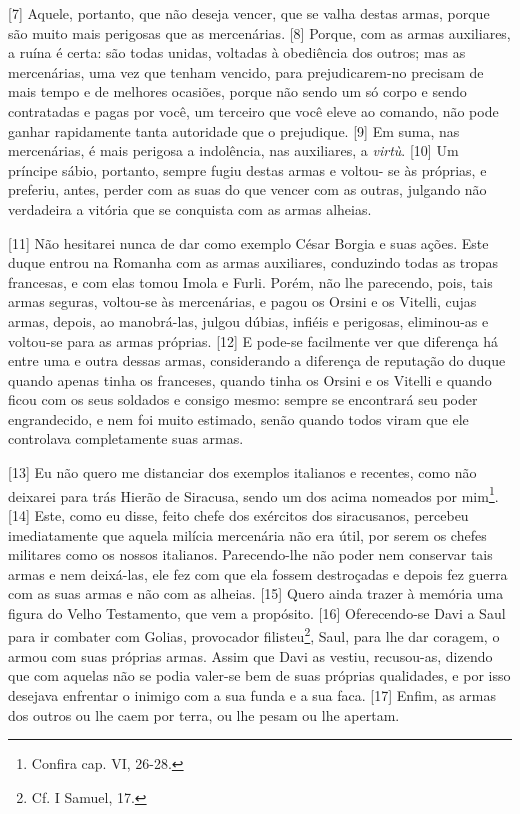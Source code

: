 {[}7{]} Aquele, portanto, que não deseja vencer, que se valha destas
armas, porque são muito mais perigosas que as mercenárias. {[}8{]}
Porque, com as armas auxiliares, a ruína é certa: são todas unidas,
voltadas à obediência dos outros; mas as mercenárias, uma vez que tenham
vencido, para prejudicarem-no precisam de mais tempo e de melhores
ocasiões, porque não sendo um só corpo e sendo contratadas e pagas por
você, um terceiro que você eleve ao comando, não pode ganhar rapidamente
tanta autoridade que o prejudique. {[}9{]} Em suma, nas mercenárias, é
mais perigosa a indolência, nas auxiliares, a \emph{virtù}. {[}10{]} Um
príncipe sábio, portanto, sempre fugiu destas armas e voltou- se às
próprias, e preferiu, antes, perder com as suas do que vencer com as
outras, julgando não verdadeira a vitória que se conquista com as armas
alheias.

{[}11{]} Não hesitarei nunca de dar como exemplo César Borgia e suas
ações. Este duque entrou na Romanha com as armas auxiliares, conduzindo
todas as tropas francesas, e com elas tomou Imola e Furli. Porém, não
lhe parecendo, pois, tais armas seguras, voltou-se às mercenárias, e
pagou os Orsini e os Vitelli, cujas armas, depois, ao manobrá-las,
julgou dúbias, infiéis e perigosas, eliminou-as e voltou-se para as
armas próprias. {[}12{]} E pode-se facilmente ver que diferença há entre
uma e outra dessas armas, considerando a diferença de reputação do duque
quando apenas tinha os franceses, quando tinha os Orsini e os Vitelli e
quando ficou com os seus soldados e consigo mesmo: sempre se encontrará
seu poder engrandecido, e nem foi muito estimado, senão quando todos
viram que ele controlava completamente suas armas.

{[}13{]} Eu não quero me distanciar dos exemplos italianos e recentes,
como não deixarei para trás Hierão de Siracusa, sendo um dos acima
nomeados por mim\footnote{Confira cap. VI, 26-28.}. {[}14{]} Este, como
eu disse, feito chefe dos exércitos dos siracusanos, percebeu
imediatamente que aquela milícia mercenária não era útil, por serem os
chefes militares como os nossos italianos. Parecendo-lhe não poder nem
conservar tais armas e nem deixá-las, ele fez com que ela fossem
destroçadas e depois fez guerra com as suas armas e não com as alheias.
{[}15{]} Quero ainda trazer à memória uma figura do Velho Testamento,
que vem a propósito. {[}16{]} Oferecendo-se Davi a Saul para ir combater
com Golias, provocador filisteu\footnote{Cf. I Samuel, 17.}, Saul, para
lhe dar coragem, o armou com suas próprias armas. Assim que Davi as
vestiu, recusou-as, dizendo que com aquelas não se podia valer-se bem de
suas próprias qualidades, e por isso desejava enfrentar o inimigo com a
sua funda e a sua faca. {[}17{]} Enfim, as armas dos outros ou lhe caem
por terra, ou lhe pesam ou lhe apertam.

